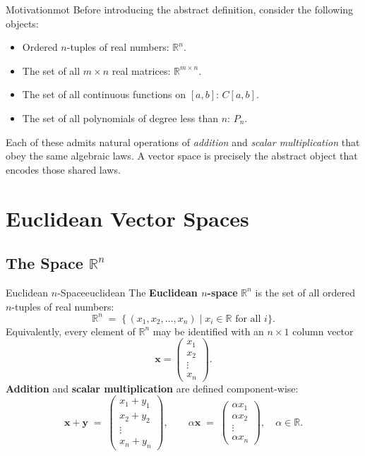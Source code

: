 \documentclass[12pt,a4paper]{article}
\newcommand{\R}{\mathbb{R}}
\newcommand{\vv}[1]{\mathbf{#1}}
\begin{document}
\begin{remark}{Motivation}{mot}
  Before introducing the abstract definition, consider the following objects:
  \begin{itemize}[leftmargin=2em]
    \item Ordered $n$-tuples of real numbers: $\R^n$.
    \item The set of all $m \times n$ real matrices: $\R^{m \times n}$.
    \item The set of all continuous functions on $[a,b]$: $C[a,b]$.
    \item The set of all polynomials of degree less than $n$: $P_n$.
  \end{itemize}
  Each of these admits natural operations of \emph{addition} and \emph{scalar
  multiplication} that obey the same algebraic laws.  A vector space is precisely
  the abstract object that encodes those shared laws.
\end{remark}


\section{Euclidean Vector Spaces}


\subsection{The Space \texorpdfstring{$\R^n$}{Rn}}

\begin{definition}{Euclidean $n$-Space}{euclidean}
  The \textbf{Euclidean $n$-space} $\R^n$ is the set of all ordered $n$-tuples of
  real numbers:
  \[
    \R^n \;=\; \bigl\{\, (x_1, x_2, \ldots, x_n) \;\big|\; x_i \in \R \text{ for all } i \bigr\}.
  \]
  Equivalently, every element of $\R^n$ may be identified with an $n \times 1$
  column vector
  \[
    \vv{x} = \begin{pmatrix} x_1 \\ x_2 \\ \vdots \\ x_n \end{pmatrix}.
  \]
  \textbf{Addition} and \textbf{scalar multiplication} are defined component-wise:
  \[
    \vv{x} + \vv{y}
    \;=\;
    \begin{pmatrix} x_1 + y_1 \\ x_2 + y_2 \\ \vdots \\ x_n + y_n \end{pmatrix},
    \qquad
    \alpha\vv{x}
    \;=\;
    \begin{pmatrix} \alpha x_1 \\ \alpha x_2 \\ \vdots \\ \alpha x_n \end{pmatrix},
    \quad \alpha \in \R.
  \]
\end{definition}
\end{document}
